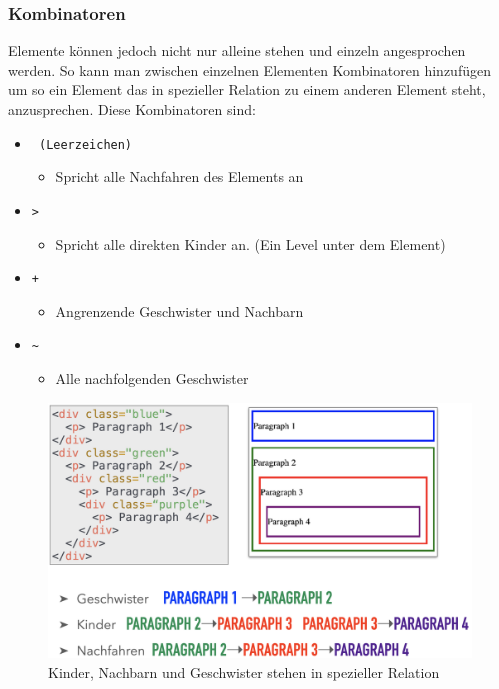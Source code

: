 \documentclass{article}
\begin{document}
	\subsubsection{Kombinatoren}
	Elemente können jedoch nicht nur alleine stehen und einzeln angesprochen werden. So kann man zwischen einzelnen Elementen Kombinatoren hinzufügen um so ein Element das in spezieller Relation zu einem anderen Element steht, anzusprechen. Diese Kombinatoren sind:
	\begin{itemize}
		\item{\texttt{ (Leerzeichen)}}
		\begin{itemize}
			\item{Spricht alle Nachfahren des Elements an}
		\end{itemize}
		\item{\texttt{>}}
		\begin{itemize}
			\item{Spricht alle direkten Kinder an. (Ein Level unter dem Element)}
		\end{itemize}
		\item{\texttt{+}}
		\begin{itemize}
			\item{Angrenzende Geschwister und Nachbarn}
		\end{itemize}
		\item{\texttt{\~}}
		\begin{itemize}
			\item{Alle nachfolgenden Geschwister}
		\end{itemize}
	\end{itemize}
	\begin{figure}
	\includegraphics[scale=0.2]{Bilder/relations.png}
	\caption{Kinder, Nachbarn und Geschwister stehen in spezieller Relation}
	\end{figure}
\end{document}
